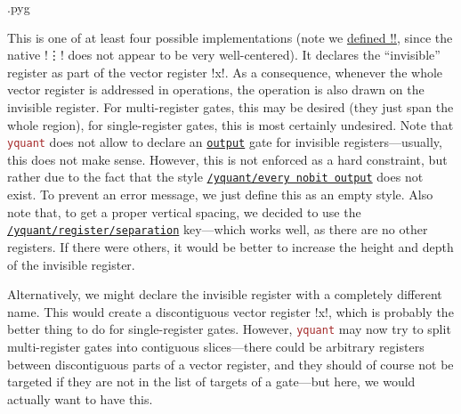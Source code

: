 \documentclass{scrartcl}
\makeatletter
\newenvironment{codeexample}{%
   \VerbatimEnvironment%
   \let\FVB@VerbatimOut\minted@FVB@VerbatimOut
   \let\FVE@VerbatimOut\minted@FVE@VerbatimOut
   \minted@configlang{tex}%
   \minted@fvset
   \begin{VerbatimOut}[codes={\catcode`\^^I=12},firstline,lastline]{\minted@jobname.pyg}%
}{
   \end{VerbatimOut}%
   \minted@langlinenoson%
   \savebox\codeexamplebox{ \minted@jobname.pyg}%
   \ifdim\wd\codeexamplebox>\dimexpr.5\linewidth-3mm\relax%
      \wd\codeexamplebox=.5\linewidth%
   \else%
      \wd\codeexamplebox=\dimexpr\wd\codeexamplebox+3mm\relax%
   \fi%
   \noindent\begin{minipage}{\wd\codeexamplebox}%
      \centering%
      \usebox\codeexamplebox%
   \end{minipage}%
   \begin{minipage}{\dimexpr\linewidth-\wd\codeexamplebox\relax}%
      \expandafter\minted@pygmentize\expandafter{\minted@lang}%
   \end{minipage}%
   \minted@langlinenosoff%
   \par%
}
\def\pkg#1{\textcolor{brown}{\texttt{#1}}}
\def\gate#1{\hyperref[gate:#1]{\texttt{#1}}}
\def\style#1{\hyperref[style:#1]{\texttt{#1}}}
\def\Yquant{\pkg{yquant}}
\makeatother
\begin{document}
               \begin{example}
                  \begin{codeexample}
\makeatletter
\DeclareRobustCommand\rvdots{%
   \vbox{%
      \baselineskip4\p@\lineskiplimit\z@%
      \kern-\p@%
      \hbox{.}\hbox{.}\hbox{.}%
   }%
}
                  \end{codeexample}
                  This is one of at least four possible implementations (note we \href{https://tex.stackexchange.com/a/112212/32357}{defined \tex!\rvdots!}, since the native \tex!\vdots! does not appear to be very well\hyp centered).
                  It declares the ``invisible'' register as part of the vector register \yquant!x!.
                  As a consequence, whenever the whole vector register is addressed in operations, the operation is also drawn on the invisible register.
                  For multi\hyp register gates, this may be desired (they just span the whole region), for single\hyp register gates, this is most certainly undesired.
                  Note that \Yquant{} does not allow to declare an \gate{output} gate for invisible registers---usually, this does not make sense.
                  However, this is not enforced as a hard constraint, but rather due to the fact that the style \style{/yquant/every nobit output} does not exist.
                  To prevent an error message, we just define this as an empty style.
                  Also note that, to get a proper vertical spacing, we decided to use the \style{/yquant/register/separation} key---which works well, as there are no other registers.
                  If there were others, it would be better to increase the height and depth of the invisible register.

                  Alternatively, we might declare the invisible register with a completely different name.
                  This would create a discontiguous vector register \yquant!x!, which is probably the better thing to do for single\hyp register gates.
                  However, \Yquant{} may now try to split multi\hyp register gates into contiguous slices---there could be arbitrary registers between discontiguous parts of a vector register, and they should of course not be targeted if they are not in the list of targets of a gate---but here, we would actually want to have this.


\end{example}
\end{document}
